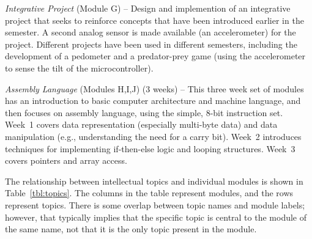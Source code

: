 \emph{Integrative Project} (Module G) --
Design and implemention of an integrative project
that seeks to reinforce concepts that have been introduced earlier in the
semester.  A second analog sensor is made available (an accelerometer)
for the project.
Different projects have been used in different semesters, including
the development of a pedometer and a predator-prey game (using the
accelerometer to sense the tilt of the microcontroller).

\emph{Assembly Language} (Modules H,I,J) (3 weeks) --
This three week set of modules has an introduction to basic computer
architecture
and machine language, and then
focuses on assembly language, using the simple, 8-bit instruction set.
Week~1 covers data representation (especially multi-byte
data) and data manipulation
(e.g., understanding the need for a carry bit).
Week~2 introduces techniques for implementing if-then-else logic
and looping structures.
Week~3 covers pointers and array access.

The relationship between intellectual topics and individual modules is
shown in Table~\ref{tbl:topics}. The columns in the table represent
modules, and the rows represent topics.
There is some overlap between topic names and module labels; however, that
typically implies that the specific topic is central to the module of the
same name, not that it is the only topic present in the module.

